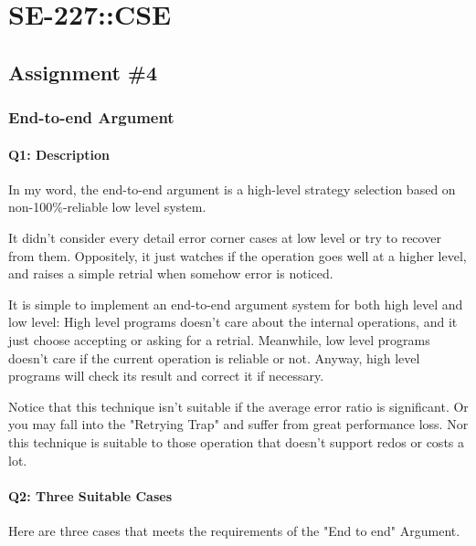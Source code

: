 \documentclass[
]{article}
\date{}
\begin{document}
\hypertarget{header-n0}{%
\section{SE-227::CSE}\label{header-n0}}

\hypertarget{header-n2}{%
\subsection{Assignment \#4}\label{header-n2}}

\hypertarget{header-n4}{%
\subsubsection{End-to-end Argument}\label{header-n4}}

\hypertarget{header-n6}{%
\paragraph{Q1: Description}\label{header-n6}}

In my word, the end-to-end argument is a high-level strategy selection
based on non-100\%-reliable low level system.

It didn't consider every detail error corner cases at low level or try
to recover from them. Oppositely, it just watches if the operation goes
well at a higher level, and raises a simple retrial when somehow error
is noticed.

It is simple to implement an end-to-end argument system for both high
level and low level: High level programs doesn't care about the internal
operations, and it just choose accepting or asking for a retrial.
Meanwhile, low level programs doesn't care if the current operation is
reliable or not. Anyway, high level programs will check its result and
correct it if necessary.

Notice that this technique isn't suitable if the average error ratio is
significant. Or you may fall into the "Retrying Trap" and suffer from
great performance loss. Nor this technique is suitable to those
operation that doesn't support redos or costs a lot.

\hypertarget{header-n28}{%
\paragraph{Q2: Three Suitable Cases}\label{header-n28}}

Here are three cases that meets the requirements of the "End to end"
Argument.
\end{document}
